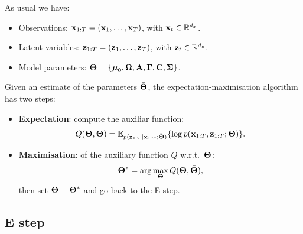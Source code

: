  As usual we have:
 \begin{itemize}
  \item Observations: $\boldsymbol{\mathbf{x}}_{1:T}=(\boldsymbol{\mathbf{x}}_1,\ldots,\boldsymbol{\mathbf{x}}_{T})$, with $\boldsymbol{\mathbf{x}}_t\in\mathbb{R}^{d_x}$.
  \item Latent variables: $\boldsymbol{\mathbf{z}}_{1:T}=(\boldsymbol{\mathbf{z}}_1,\ldots,\boldsymbol{\mathbf{z}}_{T})$, with $\boldsymbol{\mathbf{z}}_t\in\mathbb{R}^{d_z}$.
  \item Model parameters: $\boldsymbol{\mathbf{\Theta}} = \{\boldsymbol{\mathbf{\mu}}_0, \boldsymbol{\mathbf{\Omega}}, \boldsymbol{\mathbf{A}}, \boldsymbol{\mathbf{\Gamma}}, \boldsymbol{\mathbf{C}}, \boldsymbol{\mathbf{\Sigma}}\}$.
 \end{itemize}\vspace{3mm}
Given an estimate of the parameters $\bar{\boldsymbol{\mathbf{\Theta}}}$, the expectation-maximisation algorithm has two steps:
\small
\begin{itemize}
 \item \textbf{Expectation}: compute the auxiliar function:
 \begin{equation}
  Q(\boldsymbol{\mathbf{\Theta}},\bar{\boldsymbol{\mathbf{\Theta}}}) = \mathbb{E}_{p(\boldsymbol{\mathbf{z}}_{1:T}|\boldsymbol{\mathbf{x}}_{1:T};\bar{\boldsymbol{\mathbf{\Theta}}})} \{\log p(\boldsymbol{\mathbf{x}}_{1:T},\boldsymbol{\mathbf{z}}_{1:T};\boldsymbol{\mathbf{\Theta}}) \}.
 \end{equation}
 \item \textbf{Maximisation}: of the auxiliary function $Q$ w.r.t.\ $\boldsymbol{\mathbf{\Theta}}$:
 \begin{equation}
  \boldsymbol{\mathbf{\Theta}}^* = \arg\max_{\boldsymbol{\mathbf{\Theta}}} Q(\boldsymbol{\mathbf{\Theta}},\bar{\boldsymbol{\mathbf{\Theta}}}),
 \end{equation}
  then set $\bar{\boldsymbol{\mathbf{\Theta}}}=\boldsymbol{\mathbf{\Theta}}^*$ and go back to the E-step.
\end{itemize}

\subsection{E step}

